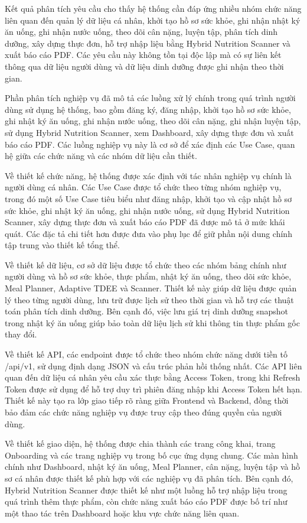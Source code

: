 Kết quả phân tích yêu cầu cho thấy hệ thống cần đáp ứng nhiều nhóm chức năng liên quan đến quản lý dữ liệu cá nhân, khởi tạo hồ sơ sức khỏe, ghi nhận nhật ký ăn uống, ghi nhận nước uống, theo dõi cân nặng, luyện tập, phân tích dinh dưỡng, xây dựng thực đơn, hỗ trợ nhập liệu bằng Hybrid Nutrition Scanner và xuất báo cáo PDF. Các yêu cầu này không tồn tại độc lập mà có sự liên kết thông qua dữ liệu người dùng và dữ liệu dinh dưỡng được ghi nhận theo thời gian.

Phần phân tích nghiệp vụ đã mô tả các luồng xử lý chính trong quá trình người dùng sử dụng hệ thống, bao gồm đăng ký, đăng nhập, khởi tạo hồ sơ sức khỏe, ghi nhật ký ăn uống, ghi nhận nước uống, theo dõi cân nặng, ghi nhận luyện tập, sử dụng Hybrid Nutrition Scanner, xem Dashboard, xây dựng thực đơn và xuất báo cáo PDF. Các luồng nghiệp vụ này là cơ sở để xác định các Use Case, quan hệ giữa các chức năng và các nhóm dữ liệu cần thiết.

Về thiết kế chức năng, hệ thống được xác định với tác nhân nghiệp vụ chính là người dùng cá nhân. Các Use Case được tổ chức theo từng nhóm nghiệp vụ, trong đó một số Use Case tiêu biểu như đăng nhập, khởi tạo và cập nhật hồ sơ sức khỏe, ghi nhật ký ăn uống, ghi nhận nước uống, sử dụng Hybrid Nutrition Scanner, xây dựng thực đơn và xuất báo cáo PDF đã được mô tả ở mức khái quát. Các đặc tả chi tiết hơn được đưa vào phụ lục để giữ phần nội dung chính tập trung vào thiết kế tổng thể.

Về thiết kế dữ liệu, cơ sở dữ liệu được tổ chức theo các nhóm bảng chính như người dùng và hồ sơ sức khỏe, thực phẩm, nhật ký ăn uống, theo dõi sức khỏe, Meal Planner, Adaptive TDEE và Scanner. Thiết kế này giúp dữ liệu được quản lý theo từng người dùng, lưu trữ được lịch sử theo thời gian và hỗ trợ các thuật toán phân tích dinh dưỡng. Bên cạnh đó, việc lưu giá trị dinh dưỡng snapshot trong nhật ký ăn uống giúp bảo toàn dữ liệu lịch sử khi thông tin thực phẩm gốc thay đổi.

Về thiết kế API, các endpoint được tổ chức theo nhóm chức năng dưới tiền tố /api/v1, sử dụng định dạng JSON và cấu trúc phản hồi thống nhất. Các API liên quan đến dữ liệu cá nhân yêu cầu xác thực bằng Access Token, trong khi Refresh Token được sử dụng để hỗ trợ duy trì phiên đăng nhập khi Access Token hết hạn. Thiết kế này tạo ra lớp giao tiếp rõ ràng giữa Frontend và Backend, đồng thời bảo đảm các chức năng nghiệp vụ được truy cập theo đúng quyền của người dùng.

Về thiết kế giao diện, hệ thống được chia thành các trang công khai, trang Onboarding và các trang nghiệp vụ trong bố cục ứng dụng chung. Các màn hình chính như Dashboard, nhật ký ăn uống, Meal Planner, cân nặng, luyện tập và hồ sơ cá nhân được thiết kế phù hợp với các nghiệp vụ đã phân tích. Bên cạnh đó, Hybrid Nutrition Scanner được thiết kế như một luồng hỗ trợ nhập liệu trong quá trình thêm thực phẩm, còn chức năng xuất báo cáo PDF được bố trí như một thao tác trên Dashboard hoặc khu vực chức năng liên quan.

